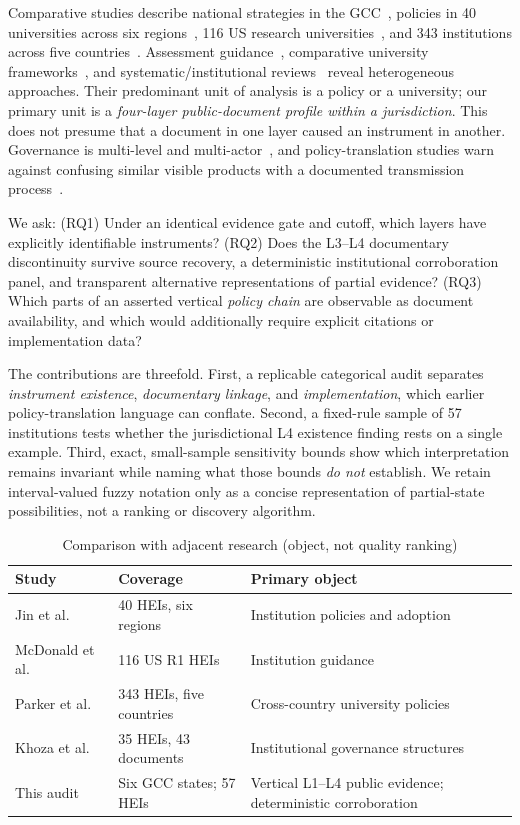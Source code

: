 \documentclass[conference,letterpaper]{IEEEtran}
\begin{document}
Comparative studies describe national strategies in the GCC~\cite{albous}, policies in 40 universities across six regions~\cite{jin}, 116 US research universities~\cite{mcdonald}, and 343 institutions across five countries~\cite{parker}. Assessment guidance~\cite{moorhouse}, comparative university frameworks~\cite{li}, and systematic/institutional reviews~\cite{jiang,khoza,an,bacalso,qian} reveal heterogeneous approaches. Their predominant unit of analysis is a policy or a university; our primary unit is a \emph{four-layer public-document profile within a jurisdiction}. This does not presume that a document in one layer caused an instrument in another. Governance is multi-level and multi-actor~\cite{vukasovic}, and policy-translation studies warn against confusing similar visible products with a documented transmission process~\cite{donina}.

We ask: (RQ1) Under an identical evidence gate and cutoff, which layers have explicitly identifiable instruments? (RQ2) Does the L3--L4 documentary discontinuity survive source recovery, a deterministic institutional corroboration panel, and transparent alternative representations of partial evidence? (RQ3) Which parts of an asserted vertical \emph{policy chain} are observable as document availability, and which would additionally require explicit citations or implementation data?

The contributions are threefold. First, a replicable categorical audit separates \emph{instrument existence}, \emph{documentary linkage}, and \emph{implementation}, which earlier policy-translation language can conflate. Second, a fixed-rule sample of 57 institutions tests whether the jurisdictional L4 existence finding rests on a single example. Third, exact, small-sample sensitivity bounds show which interpretation remains invariant while naming what those bounds \emph{do not} establish. We retain interval-valued fuzzy notation only as a concise representation of partial-state possibilities, not a ranking or discovery algorithm.

\begin{table}[!b]
\centering\caption{Comparison with adjacent research (object, not quality ranking)}\label{tab:related}
\footnotesize
\begin{tabularx}{\columnwidth}{@{}p{}p{}X@{}}
\toprule
Study & Coverage & Primary object\tabularnewline\midrule
Jin et al.~\cite{jin} & 40 HEIs, six regions & Institution policies and adoption\tabularnewline
McDonald et al.~\cite{mcdonald} & 116 US R1 HEIs & Institution guidance\tabularnewline
Parker et al.~\cite{parker} & 343 HEIs, five countries & Cross-country university policies\tabularnewline
Khoza et al.~\cite{khoza} & 35 HEIs, 43 documents & Institutional governance structures\tabularnewline
This audit & Six GCC states; 57 HEIs & Vertical L1--L4 public evidence; deterministic corroboration\tabularnewline
\bottomrule
\end{tabularx}
\end{table}
\end{document}
